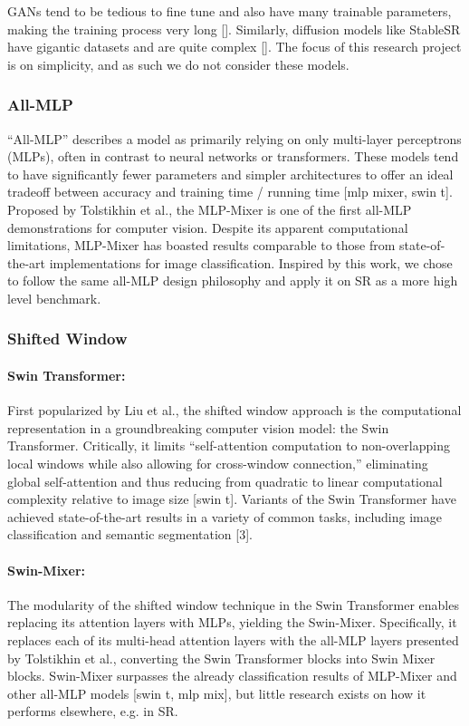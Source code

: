 \documentclass{article}
\begin{document}
GANs tend to be tedious to fine tune and also have many trainable parameters, making the training process very long []. Similarly, diffusion models like StableSR have gigantic datasets and are quite complex []. The focus of this research project is on simplicity, and as such we do not consider these models.

\subsubsection{All-MLP}

“All-MLP” describes a model as primarily relying on only multi-layer perceptrons (MLPs), often in contrast to neural networks or transformers. These models tend to have significantly fewer parameters and simpler architectures to offer an ideal tradeoff between accuracy and training time / running time [mlp mixer, swin t]. Proposed by Tolstikhin et al., the MLP-Mixer is one of the first all-MLP demonstrations for computer vision. Despite its apparent computational limitations, MLP-Mixer has boasted results comparable to those from state-of-the-art implementations for image classification. Inspired by this work, we chose to follow the same all-MLP design philosophy and apply it on SR as a more high level benchmark.

\subsubsection{Shifted Window}

\paragraph{Swin Transformer:} First popularized by Liu et al., the shifted window approach is the computational representation in a groundbreaking computer vision model: the Swin Transformer. Critically, it limits “self-attention computation to non-overlapping local windows while also allowing for cross-window connection,” eliminating global self-attention and thus reducing from quadratic to linear computational complexity relative to image size [swin t]. Variants of the Swin Transformer have achieved state-of-the-art results in a variety of common tasks, including image classification and semantic segmentation [3].

\paragraph{Swin-Mixer:} The modularity of the shifted window technique in the Swin Transformer enables replacing its attention layers with MLPs, yielding the Swin-Mixer. Specifically, it replaces each of its multi-head attention layers with the all-MLP layers presented by Tolstikhin et al., converting the Swin Transformer blocks into Swin Mixer blocks. Swin-Mixer surpasses the already classification results of MLP-Mixer and other all-MLP models [swin t, mlp mix], but little research exists on how it performs elsewhere, e.g. in SR.
\end{document}
